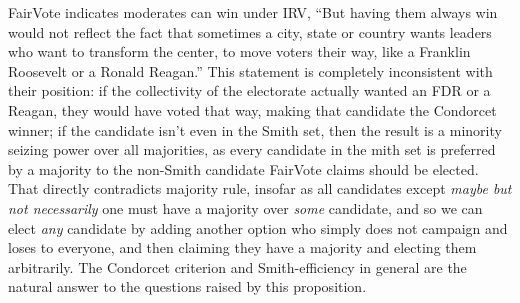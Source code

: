 %


FairVote indicates moderates can win under IRV, ``But having them always win would not reflect the fact that sometimes a city, state or country wants leaders who want to transform the center, to move voters their way, like a Franklin Roosevelt or a Ronald Reagan.''  This statement is completely inconsistent with their position:  if the collectivity of the electorate actually wanted an FDR or a Reagan, they would have voted that way, making that candidate the Condorcet winner; if the candidate isn't even in the Smith set, then the result is a minority seizing power over all majorities, as every candidate in the mith set is preferred by a majority to the non-Smith candidate FairVote claims should be elected.  That directly contradicts majority rule, insofar as all candidates except \textit{maybe but not necessarily} one must have a majority over \textit{some} candidate, and so we can elect \textit{any} candidate by adding another option who simply does not campaign and loses to everyone, and then claiming they have a majority and electing them arbitrarily.  The Condorcet criterion and Smith-efficiency in general are the natural answer to the questions raised by this proposition.

